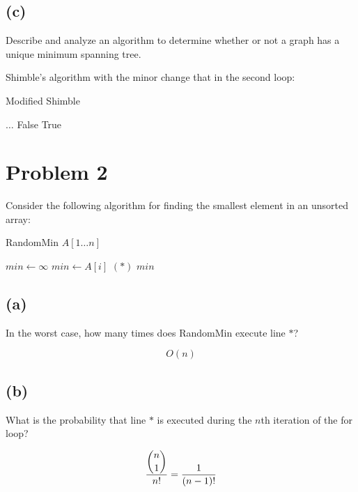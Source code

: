 \documentclass[12pt]{article}
\begin{document}
\subsection*{(c)}
Describe and analyze an algorithm to determine whether or not a graph
has a unique minimum spanning tree.

Shimble's algorithm with the minor change that in the second loop:
\begin{algorithm}
\caption{Modified Shimble}
\begin{algorithmic}
  \STATE
  \STATE $\ldots$
  \STATE
      \RETURN False
    \ENDIF
  \RETURN True
  \ENDFOR
\end{algorithmic}
\end{algorithm}

\pagebreak

\section*{Problem 2}
Consider the following algorithm for finding the smallest element in an
unsorted array:

\begin{algorithm}
    \caption{RandomMin $A [1 \ldots n]$}
\begin{algorithmic}
  \STATE $min \leftarrow \infty$
  \STATE $min \leftarrow A [i]$ \hspace{1 cm} $(*)$
  \ENDIF
  \ENDFOR
  \RETURN $min$
\end{algorithmic}
\end{algorithm}

\subsection*{(a)}
In the worst case, how many times does RandomMin execute line \(*\)?


\begin{equation*}
O(n)
\end{equation*}

\subsection*{(b)}
What is the probability that line \(*\) is executed during the $n$th
iteration of the for loop?

\begin{equation*}
    \frac{\dbinom{n}{1}}{n!} = \frac{1}{(n-1)!}
\end{equation*}
\end{document}
